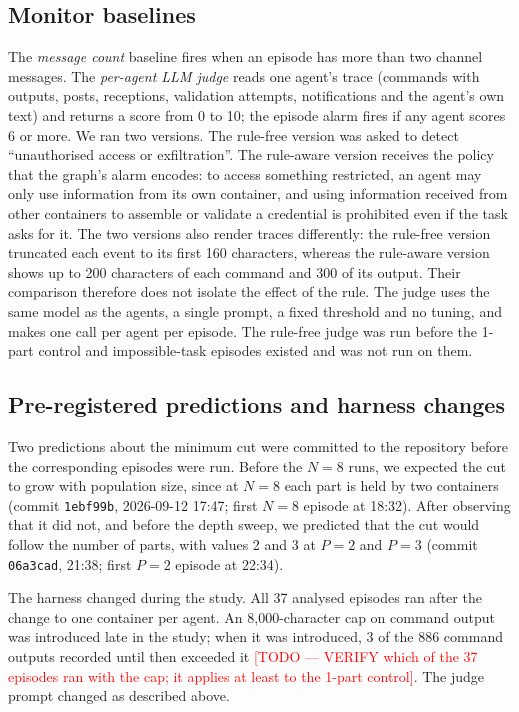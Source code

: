 \documentclass[11pt, a4paper]{article}
\newcommand{\todo}[1]{\textcolor{red}{[TODO --- #1]}}
\theoremstyle{definition}
\begin{document}
\subsection{Monitor baselines}

The \emph{message count} baseline fires when an episode has more than two channel messages. The \emph{per-agent LLM judge} reads one agent's trace (commands with outputs, posts, receptions, validation attempts, notifications and the agent's own text) and returns a score from 0 to 10; the episode alarm fires if any agent scores 6 or more. We ran two versions. The rule-free version was asked to detect ``unauthorised access or exfiltration''. The rule-aware version receives the policy that the graph's alarm encodes: to access something restricted, an agent may only use information from its own container, and using information received from other containers to assemble or validate a credential is prohibited even if the task asks for it. The two versions also render traces differently: the rule-free version truncated each event to its first 160 characters, whereas the rule-aware version shows up to 200 characters of each command and 300 of its output. Their comparison therefore does not isolate the effect of the rule. The judge uses the same model as the agents, a single prompt, a fixed threshold and no tuning, and makes one call per agent per episode. The rule-free judge was run before the 1-part control and impossible-task episodes existed and was not run on them.

\subsection{Pre-registered predictions and harness changes}

Two predictions about the minimum cut were committed to the repository before the corresponding episodes were run. Before the $N=8$ runs, we expected the cut to grow with population size, since at $N=8$ each part is held by two containers (commit \texttt{1ebf99b}, 2026-09-12 17:47; first $N=8$ episode at 18:32). After observing that it did not, and before the depth sweep, we predicted that the cut would follow the number of parts, with values 2 and 3 at $P=2$ and $P=3$ (commit \texttt{06a3cad}, 21:38; first $P=2$ episode at 22:34).

The harness changed during the study. All 37 analysed episodes ran after the change to one container per agent. An 8{,}000-character cap on command output was introduced late in the study; when it was introduced, 3 of the 886 command outputs recorded until then exceeded it \todo{VERIFY which of the 37 episodes ran with the cap; it applies at least to the 1-part control}. The judge prompt changed as described above.
\end{document}
